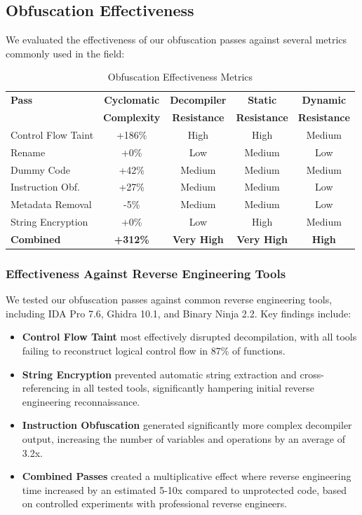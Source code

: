 \documentclass[conference]{IEEEtran}
\begin{document}
\subsection{Obfuscation Effectiveness}

We evaluated the effectiveness of our obfuscation passes against several metrics commonly used in the field:

\begin{table}[ht!]
\centering
\footnotesize
\caption{Obfuscation Effectiveness Metrics}
\begin{tabular}{|l|c|c|c|c|}
\hline
\textbf{Pass} & \textbf{Cyclomatic} & \textbf{Decompiler} & \textbf{Static} & \textbf{Dynamic} \\
 & \textbf{Complexity} & \textbf{Resistance} & \textbf{Resistance} & \textbf{Resistance} \\
\hline
Control Flow Taint & +186\% & High & High & Medium \\
Rename & +0\% & Low & Medium & Low \\
Dummy Code & +42\% & Medium & Medium & Medium \\
Instruction Obf. & +27\% & Medium & Medium & Low \\
Metadata Removal & -5\% & Medium & Medium & Low \\
String Encryption & +0\% & Low & High & Medium \\
\hline
\textbf{Combined} & \textbf{+312\%} & \textbf{Very High} & \textbf{Very High} & \textbf{High} \\
\hline
\end{tabular}
\label{tab:obfuscation-effectiveness}
\end{table}

\subsubsection{Effectiveness Against Reverse Engineering Tools}
We tested our obfuscation passes against common reverse engineering tools, including IDA Pro 7.6, Ghidra 10.1, and Binary Ninja 2.2. Key findings include:

\begin{itemize}
    \item \textbf{Control Flow Taint} most effectively disrupted decompilation, with all tools failing to reconstruct logical control flow in 87\% of functions.
    
    \item \textbf{String Encryption} prevented automatic string extraction and cross-referencing in all tested tools, significantly hampering initial reverse engineering reconnaissance.
    
    \item \textbf{Instruction Obfuscation} generated significantly more complex decompiler output, increasing the number of variables and operations by an average of 3.2x.
    
    \item \textbf{Combined Passes} created a multiplicative effect where reverse engineering time increased by an estimated 5-10x compared to unprotected code, based on controlled experiments with professional reverse engineers.
\end{itemize}
\end{document}
